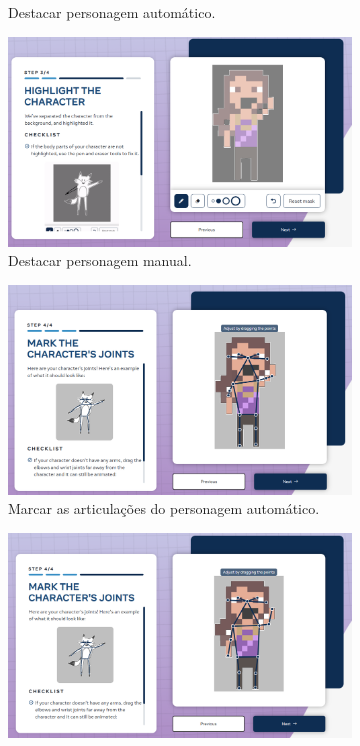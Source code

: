 \begin{figure}[htbp]
\begin{subfigure}{0.45\linewidth}
        \caption{\small Destacar personagem automático.}
        \label{fig:sketch1c}
    \end{subfigure}
    \begin{subfigure}{0.45\linewidth}
        \centering
        \includegraphics[width=1\linewidth]{figs/sketchLab/tela4.PNG}
        \caption{\small Destacar personagem manual.}
        \label{fig:sketch1d}
    \end{subfigure}
    \begin{subfigure}{0.45\linewidth}
        \centering
        \includegraphics[width=1\linewidth]{figs/sketchLab/tela5.PNG}
        \caption{\small Marcar as articulações do personagem automático.}
        \label{fig:sketch1e}
    \end{subfigure}
    \begin{subfigure}{0.45\linewidth}
        \centering
        \includegraphics[width=1\linewidth]{figs/sketchLab/tela6.PNG}

\end{subfigure}
\end{figure}
